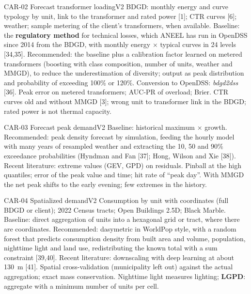 \begin{ficha}{CAR-02 \textperiodcentered{} Forecast transformer loading}{V2}
 BDGD: monthly energy and curve typology by unit, link
to the transformer and rated power [1]; CTR curves [6]; weather; sample
metering of the client's transformers, when available.
 Baseline: the \textbf{regulatory method} for technical
losses, which ANEEL has run in OpenDSS since 2014 from the BDGD, with
monthly energy × typical curves in 24 levels [34,35]. Recommended: the
baseline plus a calibration factor learned on metered transformers
(boosting with class composition, number of units, weather and MMGD), to
reduce the underestimation of diversity; output as peak distribution and
probability of exceeding 100\% or 120\%. Conversion to OpenDSS:
\emph{bdgd2dss} [36].
 Peak error on metered transformers; AUC-PR of
overload; Brier.
 CTR curves old and without MMGD [3]; wrong unit to
transformer link in the BDGD; rated power is not thermal capacity.
\end{ficha}

\begin{ficha}{CAR-03 \textperiodcentered{} Forecast peak demand}{V2}
 Baseline: historical maximum × growth.
Recommended: peak density forecast by simulation, feeding the
hourly model with many years of resampled weather and extracting the
10, 50 and 90\% exceedance probabilities (Hyndman and Fan [37]; Hong, Wilson
and Xie [38]). Recent literature: extreme values (GEV, GPD) on residuals.
 Pinball at the high quantiles; error of the peak value and
time; hit rate of ``peak day''.
 With MMGD the net peak shifts to the early evening;
few extremes in the history.
\end{ficha}

\begin{ficha}{CAR-04 \textperiodcentered{} Spatialized demand}{V2}
 Consumption by unit with coordinates (full BDGD or
client); 2022 Census tracts; Open Buildings 2.5D; Black Marble.
 Baseline: direct aggregation of units into a hexagonal
grid or tract, where there are coordinates. Recommended: dasymetric in
WorldPop style, with a random forest that predicts consumption density from built
area and volume, population, nighttime light and land use, redistributing the
known total with a sum constraint [39,40]. Recent literature:
downscaling with deep learning at about 130~m [41].
 Spatial cross-validation (municipality left out)
against the actual aggregation; exact mass conservation.
 Nighttime light measures lighting; \textbf{LGPD}: aggregate with
a minimum number of units per cell.
\end{ficha}

